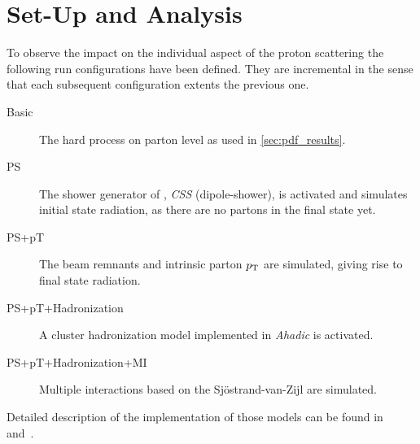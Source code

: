 \section{Set-Up and Analysis}%
\label{sec:setupan}

To observe the impact on the individual aspect of the proton
scattering the following run configurations have been defined. They
are incremental in the sense that each subsequent configuration
extents the previous one.

\begin{description}
\item[Basic] The hard process on parton level as used in \cref{sec:pdf_results}.
\item[PS] The shower generator of \sherpa, \emph{CSS} (dipole-shower),
  is activated and simulates initial state radiation, as there are no
  partons in the final state yet.
\item[PS+pT] The beam remnants and intrinsic parton
  \(p_\mathrm{T}\) are simulated, giving rise to final state radiation.
\item[PS+pT+Hadronization] A cluster hadronization model
  implemented in \emph{Ahadic} is activated.
\item[PS+pT+Hadronization+MI] Multiple interactions based on the
  Sj\"ostrand-van-Zijl are simulated.
\end{description}

Detailed description of the implementation of those models can be
found in~\cite{Gleisberg:2008ta} and~\cite{Bothmann:2019yzt}.
